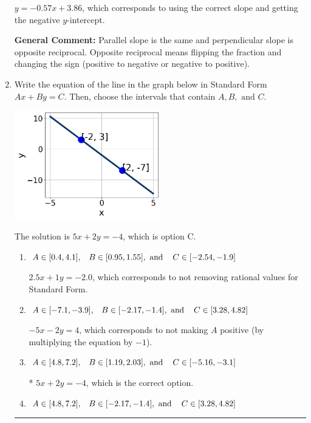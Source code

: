 \documentclass{extbook}[14pt]
\newcommand{\litem}[1]{\item #1

\rule{\textwidth}{0.4pt}}
\begin{document}
\begin{enumerate}
{\begin{enumerate}[label=\Alph*.]
 $y = -0.57x + 3.86$, which corresponds to using the correct slope and getting the negative $y$-intercept.
\end{enumerate}

\textbf{General Comment:} Parallel slope is the same and perpendicular slope is opposite reciprocal. Opposite reciprocal means flipping the fraction and changing the sign (positive to negative or negative to positive).
}
\litem{
Write the equation of the line in the graph below in Standard Form $Ax+By=C$. Then, choose the intervals that contain $A, B, \text{ and } C$.

\begin{center}
    \includegraphics[width=0.5\textwidth]{../Figures/linearGraphToStandardCopyB.png}
\end{center}


The solution is \( 5x + 2y = -4 \), which is option C.\begin{enumerate}[label=\Alph*.]
\item \( A \in [0.4, 4.1], \hspace{3mm} B \in [0.95, 1.55], \text{ and } \hspace{3mm} C \in [-2.54, -1.9] \)

 $2.5x + 1y = -2.0$, which corresponds to not removing rational values for Standard Form.
\item \( A \in [-7.1, -3.9], \hspace{3mm} B \in [-2.17, -1.4], \text{ and } \hspace{3mm} C \in [3.28, 4.82] \)

 $-5x - 2y = 4$, which corresponds to not making $A$ positive (by multiplying the equation by $-1$).
\item \( A \in [4.8, 7.2], \hspace{3mm} B \in [1.19, 2.03], \text{ and } \hspace{3mm} C \in [-5.16, -3.1] \)

* $5x + 2y = -4$, which is the correct option.
\item \( A \in [4.8, 7.2], \hspace{3mm} B \in [-2.17, -1.4], \text{ and } \hspace{3mm} C \in [3.28, 4.82] \)


\end{enumerate}}
\end{enumerate}
\end{document}
